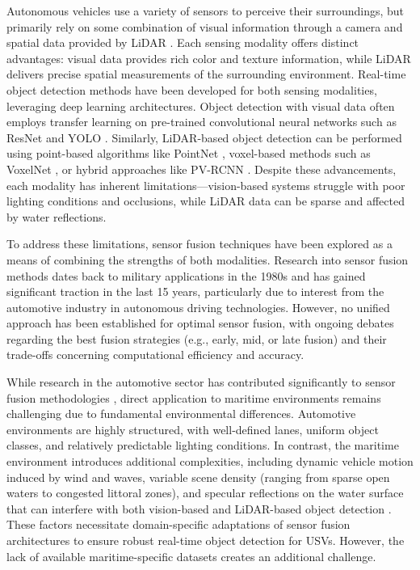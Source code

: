 \documentclass{erauthesis}
\begin{document}
Autonomous vehicles use a variety of sensors to perceive their surroundings, but primarily rely on some combination of visual information through a camera and spatial data provided by \ac{LiDAR} \cite{yeong2021}.%
Each sensing modality offers distinct advantages: visual data provides rich color and texture information, while \ac{LiDAR} delivers precise spatial measurements of the surrounding environment.
Real-time object detection methods have been developed for both sensing modalities, leveraging deep learning architectures.
Object detection with visual data often employs transfer learning on pre-trained convolutional neural networks such as ResNet \cite{he2016} and \ac{YOLO} \cite{ultralytics}.%
Similarly, \ac{LiDAR}-based object detection can be performed using point-based algorithms like PointNet \cite{garcia-garcia2016}, voxel-based methods such as VoxelNet \cite{zhou2018}, or hybrid approaches like PV-RCNN \cite{shi2021}.%
Despite these advancements, each modality has inherent limitations—vision-based systems struggle with poor lighting conditions and occlusions, while \ac{LiDAR} data can be sparse and affected by water reflections.

To address these limitations, sensor fusion techniques have been explored as a means of combining the strengths of both modalities. 
Research into sensor fusion methods dates back to military applications in the 1980s and has gained significant traction in the last 15 years, particularly due to interest from the automotive industry in autonomous driving technologies. However, no unified approach has been established for optimal sensor fusion, with ongoing debates regarding the best fusion strategies (e.g., early, mid, or late fusion) and their trade-offs concerning computational efficiency and accuracy.

While research in the automotive sector has contributed significantly to sensor fusion methodologies \cite{yeong2021,clunie2021,roriz2022,cui2022,das2022,liu2023a}, direct application to maritime environments remains challenging due to fundamental environmental differences. 
Automotive environments are highly structured, with well-defined lanes, uniform object classes, and relatively predictable lighting conditions. 
In contrast, the maritime environment introduces additional complexities, including dynamic vehicle motion induced by wind and waves, variable scene density (ranging from sparse open waters to congested littoral zones), and specular reflections on the water surface that can interfere with both vision-based \cite{liu2023a} and \ac{LiDAR}-based object detection \cite{ahmed2024}.%
These factors necessitate domain-specific adaptations of sensor fusion architectures to ensure robust real-time object detection for \acp{USV}. 
However, the lack of available maritime-specific datasets \cite{kim2022,su2023,thompson2023} creates an additional challenge.
\end{document}
